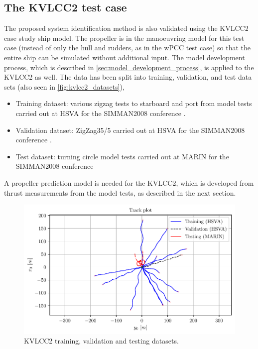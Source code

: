 \subsection{The KVLCC2 test case}
\label{\detokenize{05.01_case_studies:the-kvlcc2-test-scenarios}}
The proposed system identification method is also validated using the KVLCC2 case study ship model.
The propeller is in the manoeuvring model for this test case (instead of only the hull and rudders, as in the wPCC test case) so that the entire ship can be simulated without additional input.
The model development process, which is described in \autoref{sec:model_development_process}, is applied to the KVLCC2 as well.
The data has been split into training, validation, and test data sets (also seen in \autoref{fig:kvlcc2_datasets}),
\vspace{5pt}
\begin{itemize}
    \setlength\itemsep{5pt}
    \item Training dataset: various zigzag tests to starboard and port from model tests carried out at HSVA for the SIMMAN2008 conference \cite{stern_experience_2011}.
    \item Validation dataset: ZigZag35/5 carried out at HSVA for the SIMMAN2008 conference \cite{stern_experience_2011}.
    \item Test dataset: turning circle model tests carried out at MARIN for the SIMMAN2008 conference \cite{stern_experience_2011}
\end{itemize}
\vspace{5pt}
\noindent A propeller prediction model is needed for the KVLCC2, which is developed from thrust measurements from the model tests, as described in the next section.
\begin{figure}[h!]
\centering
\includegraphics[width=1.0\textwidth]{kappa/images/4.pdf}
\caption{KVLCC2 training, validation and testing datasets.}\label{fig:kvlcc2_datasets}\end{figure}
